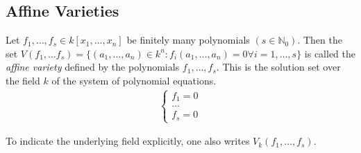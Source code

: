 \clearpage
\subsection{Affine Varieties} 

\begin{definition}[title = Definition 1.2.1] 
  Let $f_1,\ldots, f_s \in k[x_1, \dots, x_n]$ be finitely many polynomials $(s \in \mathbb{N}_0)$. Then the set $V(f_1, \ldots f_s) = \{(a_1, \ldots, a_n) \in k^n: f_i(a_1, \ldots, a_n) = 0 \forall i = 1, \ldots, s\}$ 
  is called the \textit{affine variety} defined by the polynomials $f_1, \ldots, f_s$. This is the solution set over the field $k$ of the system of polynomial equations.
  \begin{align*}
    \left\{
      \begin{aligned}
          f_1 = 0 \\
          \dots \\ 
          f_s = 0
      \end{aligned}
    \right.
  \end{align*}
 
  To indicate the underlying field explicitly, one also writes $V_k(f_1, \ldots, f_s)$. 
\end{definition}

